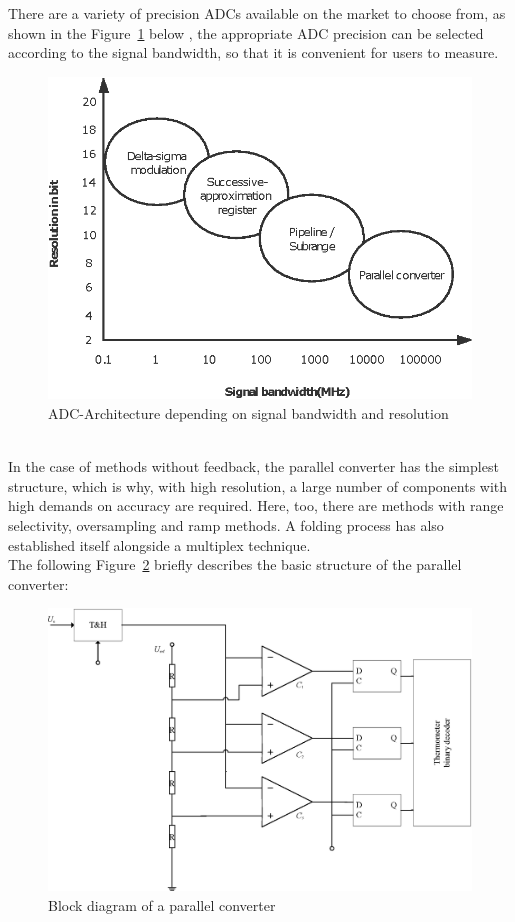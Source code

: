 There are a variety of precision ADCs available on the market to choose from, as shown in the Figure~\ref{fig:2.2} below , the appropriate ADC precision can be selected according to the signal bandwidth, so that it is convenient for users to measure.
\begin{figure}[h]
	\centering
	\includegraphics{grafiken/2.2.eps}
	\caption{ADC-Architecture depending on signal bandwidth and resolution} 
	\label{fig:2.2}
\end{figure}
\\
In the case of methods without feedback, the parallel converter has the simplest structure, which is why, with high resolution, a large number of components with high demands on accuracy are required. Here, too, there are methods with range selectivity, oversampling and ramp methods. A folding process has also established itself alongside a multiplex technique. 
\\
The following Figure~\ref{fig:2.3} briefly describes the basic structure of the parallel converter:
\begin{figure}[h]
	\centering
	\includegraphics[width=15cm]{grafiken/2.3.eps}
	\caption{Block diagram of a parallel converter} 
	\label{fig:2.3}
\end{figure}
